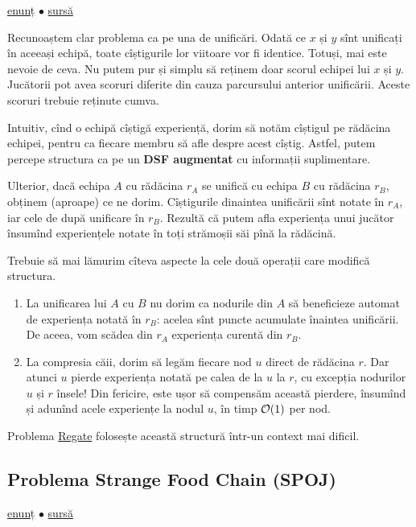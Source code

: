 \documentclass[../main.tex]{subfiles}
\begin{document}
\href{https://codeforces.com/edu/course/2/lesson/7/1/practice/contest/289390/problem/C}{enunț}
$\bullet$
\hyperref[code:experience]{sursă}

Recunoaștem clar problema ca pe una de unificări. Odată ce $x$ și $y$ sînt unificați în aceeași echipă, toate cîștigurile lor viitoare vor fi identice. Totuși, mai este nevoie de ceva. Nu putem pur și simplu să reținem doar scorul echipei lui $x$ și $y$. Jucătorii pot avea scoruri diferite din cauza parcursului anterior unificării. Aceste scoruri trebuie reținute cumva.

Intuitiv, cînd o echipă cîștigă experiență, dorim să notăm cîștigul pe rădăcina echipei, pentru ca fiecare membru să afle despre acest cîștig. Astfel, putem percepe structura ca pe un \textbf{DSF augmentat} cu informații suplimentare.

Ulterior, dacă echipa $A$ cu rădăcina $r_A$ se unifică cu echipa $B$ cu rădăcina $r_B$, obținem (aproape) ce ne dorim. Cîștigurile dinaintea unificării sînt notate în $r_A$, iar cele de după unificare în $r_B$. Rezultă că putem afla experiența unui jucător însumînd experiențele notate în toți strămoșii săi pînă la rădăcină.

Trebuie să mai lămurim cîteva aspecte la cele două operații care modifică structura.

\begin{enumerate}
  \item La unificarea lui $A$ cu $B$ nu dorim ca nodurile din $A$ să beneficieze automat de experiența notată în $r_B$: acelea sînt puncte acumulate înaintea unificării. De aceea, vom scădea din $r_A$ experiența curentă din $r_B$.
  \item La compresia căii, dorim să legăm fiecare nod $u$ direct de rădăcina $r$. Dar atunci $u$ pierde experiența notată pe calea de la $u$ la $r$, cu excepția nodurilor $u$ și $r$ însele! Din fericire, este ușor să compensăm această pierdere, însumînd și adunînd acele experiențe la nodul $u$, în timp $\mathcal{O}(1)$ per nod.
\end{enumerate}

Problema \hyperref[problem:regate]{Regate} folosește această structură într-un context mai dificil.


\subsection{Problema Strange Food Chain (SPOJ)}
\label{problem:strange-food-chain}

\href{https://www.spoj.com/problems/CHAIN/}{enunț}
$\bullet$
\hyperref[code:strange-food-chain]{sursă}
\end{document}
